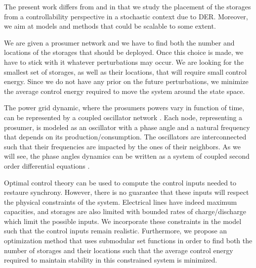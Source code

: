 \documentclass[conference]{IEEEtran}
\begin{document}
The present work differs from \cite{Gkatzikis2015} and \cite{Farraj2015} in that we study the placement of the storages from a controllability perspective in a stochastic context due to DER. Moreover, we aim at models and methods that could be scalable to some extent.  

We are given a prosumer network and we have to find both the number and locations of the storages that should be deployed. Once this choice is made, we have to stick with it whatever perturbations may occur. We are looking for the smallest set of storages, as well as their locations, that will require small control energy. Since we do not have any prior on the future perturbations, we minimize the average control energy required to move the system around the state space.






The power grid dynamic, where the prosumers powers vary in function of time, can be represented by a coupled oscillator network \cite{Filatrella2008}. Each node, representing a prosumer, is modeled as an oscillator with a phase angle and a natural frequency that depends on its production/consumption. The oscillators are interconnected such that their frequencies are impacted by the ones of their neighbors. As we will see, the phase angles dynamics can be written as a system of coupled second order differential equations \cite{Filatrella2008}.

Optimal control theory can be used to compute the control inputs needed to restaure synchrony. However, there is no guarantee that these inputs will respect the physical constraints of the system. Electrical lines have indeed maximum capacities, and storages are also limited with bounded rates of charge/discharge which limit the possible inputs. We incorporate these constraints in the model such that the control inputs remain realistic. Furthermore, we propose an optimization method that uses submodular set functions in order to find both the number of storages and their locations such that the average control energy required to maintain stability in this constrained system is minimized.
\end{document}

